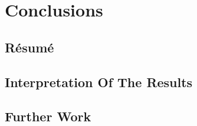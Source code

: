 \chapter{Conclusions}

\section{Résumé}

\section{Interpretation Of The Results}

\section{Further Work}

